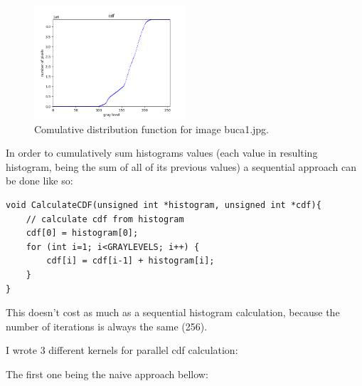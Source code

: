 \documentclass[10pt]{article}
\begin{document}
\begin{figure}[h]
\centering
\includegraphics[width=0.5\textwidth]{images/buca-c.png}
\caption{Comulative distribution function for image buca1.jpg.}
\label{fig:mbk}
\end{figure}

\vspace{1cm}

In order to cumulatively sum histograms values (each value in resulting histogram, being the sum of all of its previous values) a sequential approach can be done like so:

\begin{lstlisting}[style=cppstyle]
void CalculateCDF(unsigned int *histogram, unsigned int *cdf){
    // calculate cdf from histogram
    cdf[0] = histogram[0];
    for (int i=1; i<GRAYLEVELS; i++) {
        cdf[i] = cdf[i-1] + histogram[i];
    }
}
\end{lstlisting}

This doesn't cost as much as a sequential histogram calculation, because the number of iterations is always the same (256).

\pagebreak

I wrote 3 different kernels for parallel cdf calculation:

The first one being the naive approach bellow:
\end{document}
